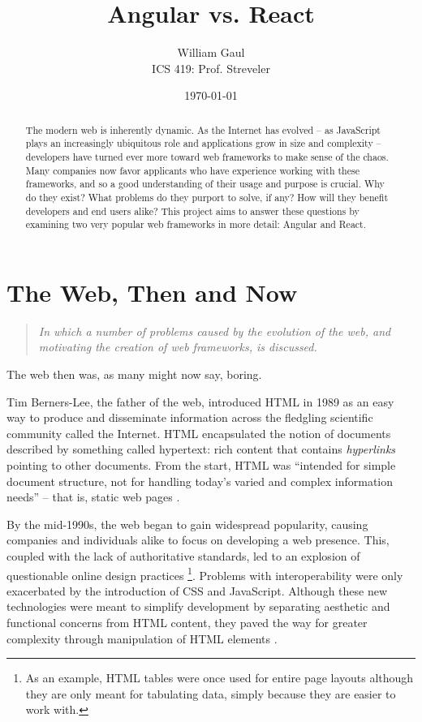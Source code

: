 \documentclass[12pt,letterpaper]{article}
\title{\textbf{Angular vs. React}}
\author{William Gaul\\{ICS 419: Prof. Streveler}}
\date{\today}
\begin{document}
\maketitle

\begin{singlespace*}
\begin{abstract}
	The modern web is inherently dynamic. As the Internet has evolved -- as JavaScript plays an increasingly ubiquitous role and applications grow in size and complexity -- developers have turned ever more toward web frameworks to make sense of the chaos. Many companies now favor applicants who have experience working with these frameworks, and so a good understanding of their usage and purpose is crucial. Why do they exist? What problems do they purport to solve, if any? How will they benefit developers and end users alike? This project aims to answer these questions by examining two very popular web frameworks in more detail: Angular and React.
\end{abstract}
\end{singlespace*}


\section{The Web, Then and Now}
\vspace{-12pt}

\begin{quote}
	\singlespacing
	\emph{In which a number of problems caused by the evolution of the web, and motivating the creation of web frameworks, is discussed.}
\end{quote}

The web then was, as many might now say, boring.

Tim Berners-Lee, the father of the web, introduced HTML in 1989 as an easy way to produce and disseminate information across the fledgling scientific community called the Internet. HTML encapsulated the notion of documents described by something called hypertext: rich content that contains \emph{hyperlinks} pointing to other documents. From the start, HTML was ``intended for simple document structure, not for handling today's varied and complex information needs'' \cite[p.~9]{Sklar:2012} -- that is, static web pages \cite{Schlensker:2014}.

By the mid-1990s, the web began to gain widespread popularity, causing companies and individuals alike to focus on developing a web presence. This, coupled with the lack of authoritative standards, led to an explosion of questionable online design practices \footnote{As an example, HTML tables were once used for entire page layouts although they are only meant for tabulating data, simply because they are easier to work with.}. Problems with interoperability were only exacerbated by the introduction of CSS and JavaScript. Although these new technologies were meant to simplify development by separating aesthetic and functional concerns from HTML content, they paved the way for greater complexity through manipulation of HTML elements \cite{Sklar:2012}.
\end{document}
